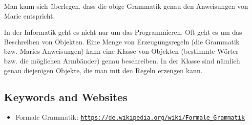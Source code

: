 \documentclass[a4paper,11pt]{report}
\newcommand{\BrochureUrlText}[1]{\texttt{#1}}
\begin{document}
Man kann sich überlegen, dass die obige Grammatik genau den Anweisungen von Marie entspricht.

In der Informatik geht es nicht nur um das Programmieren. Oft geht es um das Beschreiben von Objekten. Eine Menge von Erzeugungsregeln (die Grammatik bzw. Maries Anweisungen) kann eine Klasse von Objekten (bestimmte Wörter bzw. die möglichen Armbänder) genau beschreiben. In der Klasse sind nämlich genau diejenigen Objekte, die man mit den Regeln erzeugen kann.

{\raggedright

\subsection*{Keywords and Websites}

\begin{itemize}
  \item Formale Grammatik: \href{https://de.wikipedia.org/wiki/Formale_Grammatik}{\BrochureUrlText{https://de.wikipedia.org/wiki/Formale\_Grammatik}}
\end{itemize}


}
\end{document}
